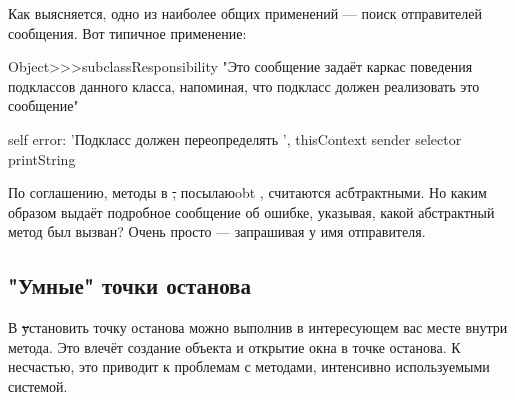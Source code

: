 \documentclass[a4paper,10pt,twoside]{book}
\begin{document}
{%
Как выясняется, одно из наиболее общих применений --- поиск отправителей сообщения.
Вот типичное применение:
\begin{code}{}
Object>>>subclassResponsibility
	"Это сообщение задаёт каркас поведения подклассов данного класса, 
	напоминая, что подкласс должен реализовать это сообщение"

	self error: 'Подкласс должен переопределять ', thisContext sender selector printString
\end{code}

По соглашению, методы в \st, посылаюobt , считаются асбтрактными. Но каким образом  выдаёт подробное сообщение об ошибке, указывая, какой абстрактный метод был вызван? Очень просто --- запрашивая у  имя отправителя.

\subsection{"Умные" точки останова}

В \st установить точку останова можно выполнив  в интересующем вас месте внутри метода. Это влечёт создание объекта  и открытие окна  в точке останова.
К несчастью, это приводит к проблемам с методами, интенсивно используемыми системой.

}
\end{document}
